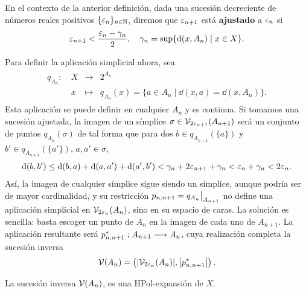\begin{definition}
  En el contexto de la anterior definición, dada una sucesión decreciente de números reales positivos $ \{\varepsilon_n \}_{n\in \mathbb{N}  } $, diremos que $ \varepsilon_{n+1} $ está \textbf{ajustado } a $ \varepsilon _n  $ si 
  \begin{gather*}
      \varepsilon_{n+1} <\frac{\varepsilon_n -\gamma_n}{2}, \quad \gamma_n = \sup\{\dd(x,A_n)\mid x\in X \}.
  \end{gather*}
\end{definition}
\iffalse
Para definir la aplicación simplicial ahora, sea
\begin{gather*}
  \begin{matrix}
  q_{A_n }: \ &X  &\longrightarrow &2^{A_n}  \\
  &x  &\mapsto &q_{A_n}(x) = \{a\in A_n \mid \dd(x,a) = \dd (x,A_n )\}.
  \end{matrix}
\end{gather*}
Esta aplicación se puede definir en cualquier $ A_n  $ y es continua. Si tomamos una sucesión ajustada, la imagen de un símplice $ \sigma \in \mathcal{V}_{2\varepsilon_{n+1}}(A_{n+1} ) $ será un conjunto de puntos $ q_{A_n}(\sigma) $ de tal forma que para dos $ b \in q_{A_{n+1}}(\{a \} ) $ y $ b'\in q_{A_{n+1}}(\{a'\}) $, $a,a'\in \sigma $,
\begin{gather*}
  \dd (b,b' ) \leq \dd (b,a )+\dd(a,a')+\dd(a',b') <\gamma_n +2\varepsilon_{n+1}+\gamma_n < \varepsilon_n +\gamma_n <2\varepsilon_n.
\end{gather*}
Así, la imagen de cualquier símplice sigue siendo un símplice, aunque podría ser de mayor cardinalidad, y su restricción $p_{n,n+1} =  \rest{q_{A_n }}{A_{n+1}} $ no define una aplicación simplicial en $ \mathcal{V}_{2\varepsilon_n}(A_{n}) $, sino en su espacio de caras. La solución es sencilla: basta escoger un punto de $ A_n  $ en la imagen de cada uno de $ A_{n+1 } $. La aplicación resultante será  $ p_{n,n+1 }^* :A_{n+1}\longrightarrow A_n $, cuya realización completa la sucesión inversa
\begin{gather*}
     \mathcal{V}(A_n )  = \left(\abs{\mathcal{V}_{2\varepsilon_n }(A_n)},\abs{p_{n,n+1 }^*}\right). 
\end{gather*}
\begin{theorem}
  La sucesión inversa $ \mathcal{V}(A_n ) $, es una HPol-expansión de $ X  $.
\end{theorem}
